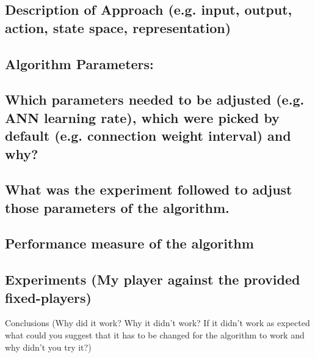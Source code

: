 
\subsection{Description of Approach (e.g. input, output, action, state space,
representation)}

\subsection{Algorithm Parameters:}

\subsection{Which parameters needed to be adjusted (e.g. ANN learning rate),
which were picked by default (e.g. connection weight interval) and why?}

\subsection{What was the experiment followed to adjust those parameters of the
algorithm.}

\subsection{Performance measure of the algorithm}

\subsection{Experiments (My player against the provided ﬁxed-players)}
Conclusions (Why did it work? Why it didn't work? If it didn't work as expected what could you suggest that it has to be changed for the algorithm to work and why didn't you try it?)
